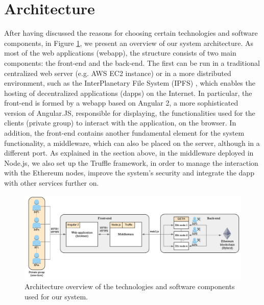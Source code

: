 \section{Architecture} \label{architecture}

After having discussed the reasons for choosing certain technologies and software components, in Figure \ref{fig:archi}, we present an overview of our system architecture. As most of the web applications (webapp), the structure consists of two main components: the front-end and the back-end. The first can be run in a traditional centralized web server (e.g. AWS EC2 instance) or in a more distributed environment, such as the InterPlanetary File System (IPFS) \citep{benet2014ipfs}, which enables the hosting of decentralized applications (dapps) on the Internet. In particular, the front-end is formed by a webapp based on Angular 2, a more sophisticated version of Angular.JS, responsible for displaying, the functionalities used for the clients (private group) to interact with the application, on the browser. In addition, the front-end contains another fundamental element for the system functionality, a middleware, which can also be placed on the server, although in a different port. As explained in the section above, in the middleware deployed in Node.js, we also set up the Truffle framework, in order to manage the interaction with the Ethereum nodes, improve the system's security and integrate the dapp with other services further on.

\begin{figure}[bth]
	\centering
	\includegraphics[width=1\linewidth]{gfx/Implementation_architecture}    
  	\caption{Architecture overview of the technologies and software components used for our system.}
  	\label{fig:archi}
\end{figure}

